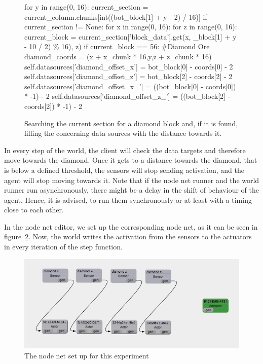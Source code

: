 		\begin{figure}[ht]
			\centering
			\begin{minipage}{18cm}
				\begin{pseudocode}
for y in range(0, 16):
 current_section = current_column.chunks[int((bot_block[1] + y -  2) / 16)]
 if current_section != None:
  for x in range(0, 16):
   for z in range(0, 16):
    current_block = current_section['block_data'].get(x, _block[1] + y - 10 / 2) \% 16), z)
    if current_block == 56: #Diamond Ore
     diamond_coords = (x + x_chunk * 16,y,z + z_chunk * 16)
      self.datasources['diamond_offset_x'] = bot_block[0] - coords[0] - 2
      self.datasources['diamond_offset_z'] = bot_block[2] - coords[2] - 2
      self.datasources['diamond_offset_x_'] = ((bot_block[0] - coords[0]) * -1) - 2
      self.datasources['diamond_offset_z_'] = ((bot_block[2] - coords[2]) * -1) - 2
			\end{pseudocode}
		\caption{Searching the current section for a diamond block and, if it is found, filling the concerning data sources with the distance towards it.}
		\label{listing_sensors}
	\end{minipage}
\end{figure}
    

    
In every step of the world, the client will check the data targets and therefore move towards the diamond. Once it gets to a distance towards the diamond, that is below a defined threshold, the sensors will stop sending activation, and the agent will stop moving towards it. Note that if the node net runner and the world runner run asynchronously, there might be a delay in the shift of behaviour of the agent. Hence, it is advised, to run them synchronously or at least with a timing close to each other.

In the node net editor, we set up the corresponding node net, as it can be seen in figure~\ref{nodenet_setup}. Now, the world writes the activation from the sensors to the actuators in every iteration of the step function.

\begin{figure}[h]
  \centering
    \includegraphics[width=14cm]{graphics/nodenet_setup}
  \caption{The node net set up for this experiment}
  \label{nodenet_setup}
\end{figure}

